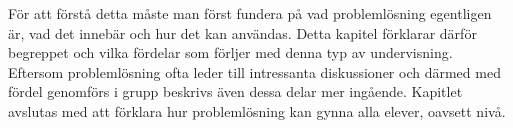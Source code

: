 \textcolor{lila}{För att förstå detta måste man först fundera på vad problemlösning egentligen är, vad det innebär och hur det kan användas. Detta kapitel förklarar därför begreppet och vilka fördelar som förljer med denna typ av undervisning. Eftersom problemlösning ofta leder till intressanta diskussioner och därmed med fördel genomförs i grupp beskrivs även dessa delar mer ingående. Kapitlet avslutas med att förklara hur problemlösning kan gynna alla elever, oavsett nivå.}